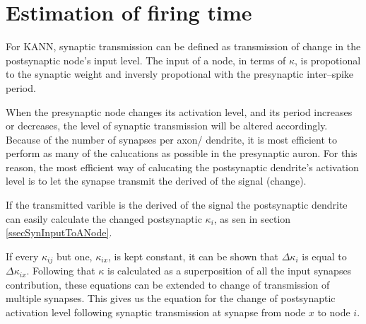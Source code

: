 




	\section{Estimation of firing time}
	For KANN, synaptic transmission can be defined as transmission of change in the postsynaptic node's input level.
	The input of a node, in terms of $\kappa$, is propotional to the synaptic weight and inversly propotional with the presynaptic inter--spike period.

	When the presynaptic node changes its activation level, and its period increases or decreases, the level of synaptic transmission will be altered accordingly. 
	Because of the number of synapses per axon/ dendrite, it is most efficient to perform as many of the calucations as possible in the presynaptic auron.
	For this reason, the most efficient way of calucating the postsynaptic dendrite's activation level is to let the synapse transmit the derived of the signal (change).

	If the transmitted varible is the derived of the signal the postsynaptic dendrite can easily calculate the changed postsynaptic $\kappa_i$, as sen in section \ref{ssecSynInputToANode}.
	
	If every $\kappa_{ij}$ but one, $\kappa_{ix}$, is kept constant, it can be shown that $\Delta \kappa_i$ is equal to $\Delta \kappa_{ix}$.
	Following that $\kappa$ is calculated as a superposition of all the input synapses contribution, these equations can be extended to change of transmission of multiple synapses.
	This gives us the equation for the change of postsynaptic activation level following synaptic transmission at synapse from node $x$ to node $i$.

